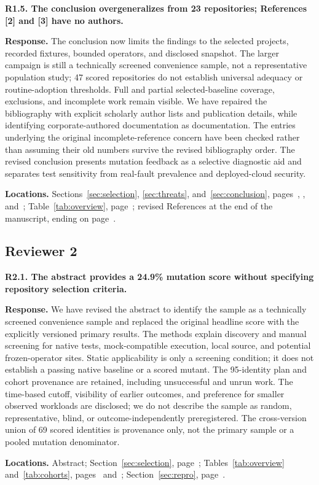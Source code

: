 \medskip
\noindent\textbf{R1.5. The conclusion overgeneralizes from 23 repositories; References [2] and [3] have no authors.}\label{response:R1.5}\par
\textbf{Response.} The conclusion now limits the findings to the selected projects, recorded fixtures, bounded operators, and disclosed snapshot. The larger campaign is still a technically screened convenience sample, not a representative population study; 47 scored repositories do not establish universal adequacy or routine-adoption thresholds. Full and partial selected-baseline coverage, exclusions, and incomplete work remain visible. We have repaired the bibliography with explicit scholarly author lists and publication details, while identifying corporate-authored documentation as documentation. The entries underlying the original incomplete-reference concern have been checked rather than assuming their old numbers survive the revised bibliography order. The revised conclusion presents mutation feedback as a selective diagnostic aid and separates test sensitivity from real-fault prevalence and deployed-cloud security.\par
\textbf{Locations.} Sections~\ref{sec:selection}, \ref{sec:threats}, and~\ref{sec:conclusion}, pages~\pageref{sec:selection}, \pageref{sec:threats}, and~\pageref{sec:conclusion}; Table~\ref{tab:overview}, page~\pageref{tab:overview}; revised References at the end of the manuscript, ending on page~\pageref{lastmanuscriptpage}.

\subsection*{Reviewer 2}

\noindent\textbf{R2.1. The abstract provides a 24.9\% mutation score without specifying repository selection criteria.}\label{response:R2.1}\par
\textbf{Response.} We have revised the abstract to identify the sample as a technically screened convenience sample and replaced the original headline score with the explicitly versioned primary results. The methods explain discovery and manual screening for native tests, mock-compatible execution, local source, and potential frozen-operator sites. Static applicability is only a screening condition; it does not establish a passing native baseline or a scored mutant. The 95-identity plan and cohort provenance are retained, including unsuccessful and unrun work. The time-based cutoff, visibility of earlier outcomes, and preference for smaller observed workloads are disclosed; we do not describe the sample as random, representative, blind, or outcome-independently preregistered. The cross-version union of 69 scored identities is provenance only, not the primary sample or a pooled mutation denominator.\par
\textbf{Locations.} Abstract; Section~\ref{sec:selection}, page~\pageref{sec:selection}; Tables~\ref{tab:overview} and~\ref{tab:cohorts}, pages~\pageref{tab:overview} and~\pageref{tab:cohorts}; Section~\ref{sec:repro}, page~\pageref{sec:repro}.

